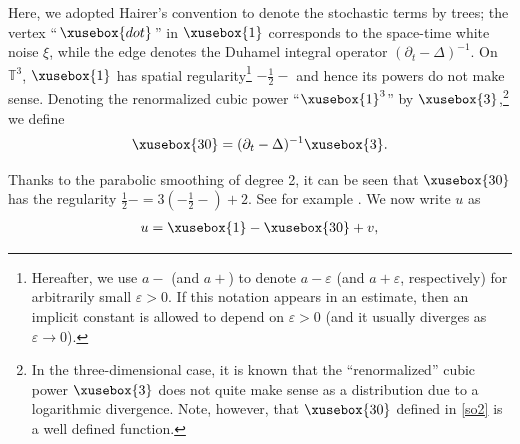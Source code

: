\documentclass[%
11pt,  reqno]{amsart}
\def\<#1>{\xusebox{#1}}
\newcommand{\1}{\hspace{0.2mm}\text{I}\hspace{0.2mm}}
\newcommand{\noi}{\noindent}
\newcommand{\T}{\mathbb{T}}
\newcommand{\Dl}{\Delta}
\newcommand{\eps}{\varepsilon}
\newcommand{\dt}{\partial_t}
\numberwithin{equation}{section}
\numberwithin{theorem}{section}
\begin{document}
\noi
Here,  we adopted Hairer's convention to denote the stochastic terms by trees;
the vertex ``\,$\<dot>$\,'' in $\<1>$ corresponds to the space-time white noise $\xi$,
while the edge denotes the Duhamel integral operator $(\dt - \Dl)^{-1}$.
On $\T^3$, $\<1>$ has spatial regularity\footnote{Hereafter, we use $a-$ 
(and $a+$) to denote $a- \eps$ (and $a+ \eps$, respectively)
for arbitrarily small $\eps > 0$.
If this notation appears in an estimate, 
then  an implicit constant 
is allowed to depend on $\eps> 0$ (and it usually diverges as $\eps \to 0$).
}
$-\frac 12 -$
and hence its powers do not make sense.
Denoting the renormalized cubic power ``$\<1>^3$''
by $\<3>$,\footnote{In the three-dimensional case, it is known that the ``renormalized'' cubic 
power $\<3>$ does not quite make sense as a distribution due to a logarithmic divergence.
Note, however, that   $\<30>$ defined in \eqref{so2} is a well defined function.}
we define
\begin{align}
  \<30> = (\dt - \Dl)^{-1} \<3>.
\label{so2}
\end{align}

\noi
Thanks to the parabolic smoothing of degree 2, 
it can be seen that $\<30>$ has the regularity $\frac 12- = 3(-\frac 12-) + 2$.
See for example \cite{MWX}.
We now write  $u$ as 
\begin{align}
u = \<1> - \<30> + v, 
\label{decomp2}
\end{align}
\end{document}
